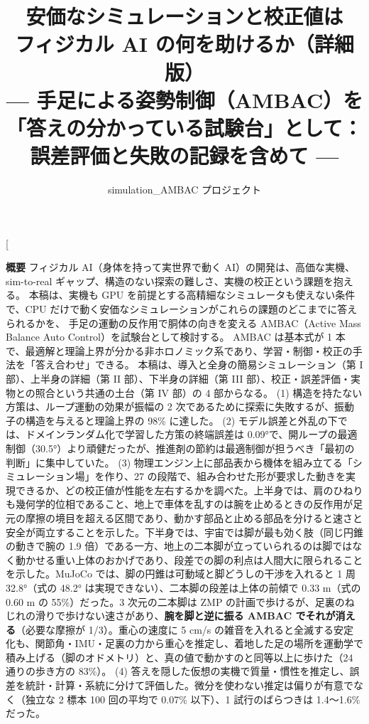 \documentclass[paper=a4paper,fontsize=10pt,twocolumn,column_gap=2zw,line_length=24zw,number_of_lines=46,head_space=20mm]{jlreq}
\title{\textbf{安価なシミュレーションと校正値は\\フィジカル AI の何を助けるか（詳細版）}\\[0.3em]
\large --- 手足による姿勢制御（AMBAC）を「答えの分かっている試験台」として：\\誤差評価と失敗の記録を含めて ---}
\author{simulation\_AMBAC プロジェクト}
\date{\fpversion}
\begin{document}
\twocolumn[
\begin{@twocolumnfalse}
\maketitle
\vspace{-1.5em}
\begin{center}\begin{minipage}{0.9\textwidth}\small
\textbf{概要}\quad
フィジカル AI（身体を持って実世界で動く AI）の開発は、高価な実機、sim-to-real ギャップ、構造のない探索の難しさ、実機の校正という課題を抱える。
本稿は、実機も GPU を前提とする高精細なシミュレータも使えない条件で、CPU だけで動く安価なシミュレーションがこれらの課題のどこまでに答えられるかを、
手足の運動の反作用で胴体の向きを変える AMBAC（Active Mass Balance Auto Control）を試験台として検討する。
AMBAC は基本式が 1 本で、最適解と理論上界が分かる非ホロノミック系であり、学習・制御・校正の手法を「答え合わせ」できる。
本稿は、導入と全身の簡易シミュレーション（第 I 部）、上半身の詳細（第 II 部）、下半身の詳細（第 III 部）、校正・誤差評価・実物との照合という共通の土台（第 IV 部）の 4 部からなる。
(1) 構造を持たない方策は、ループ運動の効果が振幅の 2 次であるために探索に失敗するが、振動子の構造を与えると理論上界の 98\% に達した。
(2) モデル誤差と外乱の下では、ドメインランダム化で学習した方策の終端誤差は 0.09°で、開ループの最適制御（30.5°）より頑健だったが、推進剤の節約は最適制御が担うべき「最初の判断」に集中していた。
(3) 物理エンジン上に部品表から機体を組み立てる「シミュレーション場」を作り、27 の段階で、組み合わせた形が要求した動きを実現できるか、どの校正値が性能を左右するかを調べた。上半身では、肩のひねりも幾何学的位相であること、地上で車体を乱すのは腕を止めるときの反作用が足元の摩擦の境目を超える区間であり、動かす部品と止める部品を分けると速さと安全が両立することを示した。下半身では、宇宙では脚が最も効く肢（同じ円錐の動きで腕の 1.9 倍）である一方、地上の二本脚が立っていられるのは脚ではなく動かせる重い上体のおかげであり、段差での脚の利点は人間大に限られることを示した。MuJoCo では、脚の円錐は可動域と脚どうしの干渉を入れると 1 周 32.8°（式の 48.2° は実現できない）、二本脚の段差は上体の前傾で 0.33 m（式の 0.60 m の 55\%）だった。3 次元の二本脚は ZMP の計画で歩けるが、足裏のねじれの滑りで歩けない速さがあり、\textbf{腕を脚と逆に振る AMBAC でそれが消える}（必要な摩擦が 1/3）。重心の速度に 5 cm/s の雑音を入れると全滅する安定化も、関節角・IMU・足裏の力から重心を推定し、着地した足の場所を運動学で積み上げる（脚のオドメトリ）と、真の値で動かすのと同等以上に歩けた（24 通りの歩き方の 83\%）。
(4) 答えを隠した仮想の実機で質量・慣性を推定し、誤差を統計・計算・系統に分けて評価した。微分を使わない推定は偏りが有意でなく（独立な 2 標本 100 回の平均で 0.07\% 以下）、1 試行のばらつきは 1.4〜1.6\% だった。

\end{minipage}
\end{center}
\end{@twocolumnfalse}
\end{document}
